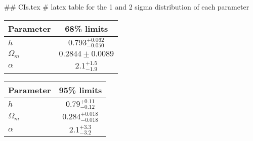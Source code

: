 ## CIs.tex
# latex table for the 1 and 2 sigma distribution of each parameter

\begin{tabular} { l  c}
 Parameter &  68\% limits\\
\hline
{\boldmath$h              $} & $0.793^{+0.062}_{-0.050}   $\\
{\boldmath$\Omega_m       $} & $0.2844\pm 0.0089          $\\
{\boldmath$\alpha         $} & $2.1^{+1.5}_{-1.9}         $\\
\hline
\end{tabular}

\begin{tabular} { l  c}
 Parameter &  95\% limits\\
\hline
{\boldmath$h              $} & $0.79^{+0.11}_{-0.12}      $\\
{\boldmath$\Omega_m       $} & $0.284^{+0.018}_{-0.018}   $\\
{\boldmath$\alpha         $} & $2.1^{+3.3}_{-3.2}         $\\
\hline
\end{tabular}
